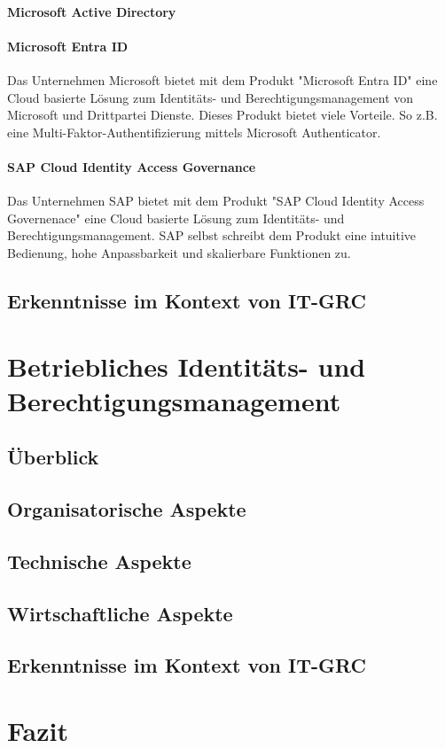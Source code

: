 \documentclass[10pt]{article}
\begin{document}
\paragraph{Microsoft Active Directory}
\paragraph{Microsoft Entra ID}
Das Unternehmen Microsoft bietet mit dem Produkt "Microsoft Entra ID" eine Cloud basierte Lösung zum Identitäts- und Berechtigungsmanagement von Microsoft und Drittpartei Dienste. Dieses Produkt bietet viele Vorteile. So z.B. eine Multi-Faktor-Authentifizierung mittels Microsoft Authenticator.
\paragraph{SAP Cloud Identity Access Governance}
Das Unternehmen SAP bietet mit dem Produkt "SAP Cloud Identity Access Governenace" eine Cloud basierte Lösung zum Identitäts- und Berechtigungsmanagement. SAP selbst schreibt dem Produkt eine intuitive Bedienung, hohe Anpassbarkeit und skalierbare Funktionen zu.
\subsection{Erkenntnisse im Kontext von IT-GRC}
\section{Betriebliches Identitäts- und Berechtigungsmanagement}
\subsection{Überblick}
\subsection{Organisatorische Aspekte}
\subsection{Technische Aspekte}
\subsection{Wirtschaftliche Aspekte}
\subsection{Erkenntnisse im Kontext von IT-GRC}
\section{Fazit}
\end{document}
